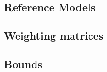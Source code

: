 \subsection{Reference Models}
%
%
%
%
%
%

\subsection{Weighting matrices}
\label{sec:Weighting matrices:TKC}
%
%
%
%
%
%
\subsection{Bounds}
\label{sec:Bounds:TKC}
%
%

\endinput

Any text after an \endinput is ignored.
You could put scraps here or things in progress.
